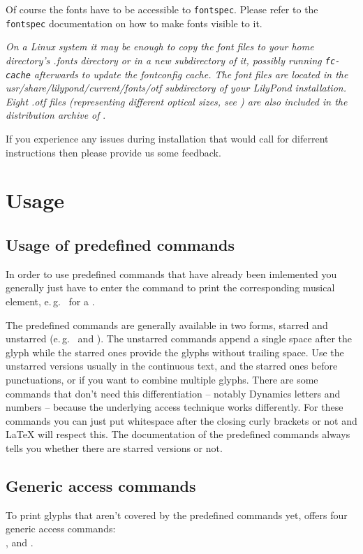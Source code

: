 \documentclass{article}
\begin{document}
Of course the fonts have to be accessible to \texttt{fontspec}. 
Please refer to the \texttt{fontspec} documentation on how to make fonts visible to it. 

\textit{On a Linux system it may be enough to copy the \emmentaler font files to your home directory's .fonts directory or in a new subdirectory of it, possibly running \texttt{fc-cache} afterwards to update the fontconfig cache. 
The font files are located in the usr/share/lilypond/current/fonts/otf subdirectory of your LilyPond installation. 
Eight .otf files (representing different optical sizes, see ) are also included in the distribution archive of \lilyglyphs}.

If you experience any issues during installation that would call for diferrent instructions then please provide us some feedback.

\section{Usage}
\label{sec:usage}

\subsection{Usage of predefined commands}
\label{subsec:usage_predefined_commands}
In order to use predefined commands that have already been imlemented you generally just have to enter the command to print the corresponding musical element, e.\,g.\  for a \lilyTimeC*.

The predefined commands are generally available in two forms, starred and unstarred (e.\,g.\  and ). 
The unstarred commands append a single space after the glyph while the starred ones provide the glyphs without trailing space. 
Use the unstarred versions usually in the continuous text, and the starred ones before punctuations, or if you want to combine multiple glyphs.
There are some commands that don't need this differentiation -- notably Dynamics letters and numbers -- because the underlying access technique works differently.
For these commands you can just put whitespace after the closing curly brackets or not and \LaTeX{} will respect this.
The documentation of the predefined commands always tells you whether there are starred versions or not.

\subsection{Generic access commands}
\label{subsec:generic_access_commands}
To print \emmentaler glyphs that aren't covered by the predefined commands yet, \lilyglyphs offers four generic access commands:\\
,   and . 
\end{document}
